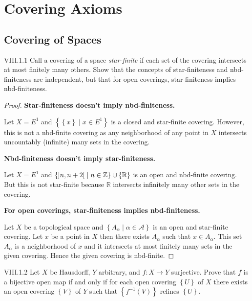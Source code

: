 \chapter{Covering Axioms}

\section{Covering of Spaces}

\begin{problem}{VIII.1.1}
Call a covering of a space \textit{star-finite} if each set of the covering intersects at most finitely many others. Show that the concepts of star-finiteness and nbd-finiteness are independent, but that for open coverings, star-finiteness implies nbd-finiteness.
\end{problem}

\begin{proof}
	\textbf{Star-finiteness doesn't imply nbd-finiteness.}

	Let \( X = E^{1} \) and \( \left\{ \left\{ x \right\} \mid x \in E^{1} \right\} \) is a closed and star-finite covering. However, this is not a nbd-finite covering as any neighborhood of any point in \( X \) intersects uncountably (infinite) many sets in the covering.

	\textbf{Nbd-finiteness doesn't imply star-finiteness.}

	Let \( X = E^{1} \) and \( \left\{ \left\rbrack{n, n + 2}\right\lbrack \mid n \in \mathbb{Z} \right\} \cup \left\{ \mathbb{R} \right\} \) is an open and nbd-finite covering. But this is not star-finite because \( \mathbb{R} \) intersects infinitely many other sets in the covering.

	\textbf{For open coverings, star-finiteness implies nbd-finiteness.}

	Let \( X \) be a topological space and \( \left\{ A_{\alpha} \mid \alpha \in \mathscr{A} \right\} \) is an open and star-finite covering. Let \( x \) be a point in \( X \) then there exists \( A_{\alpha} \) such that \( x \in A_{\alpha} \). This set \( A_{\alpha} \) is a neighborhood of \( x \) and it intersects at most finitely many sets in the given covering. Hence the given covering is nbd-finite.
\end{proof}

\begin{problem}{VIII.1.2}
Let \( X \) be Hausdorff, \( Y \) arbitrary, and \( f: X \to Y \) surjective. Prove that \( f \) is a bijective open map if and only if for each open covering \( \left\{ U \right\} \) of \( X \) there exists an open covering \( \left\{ V \right\} \) of \( Y \) such that \( \left\{ f^{-1}(V) \right\} \) refines \( \left\{ U \right\} \).
\end{problem}

